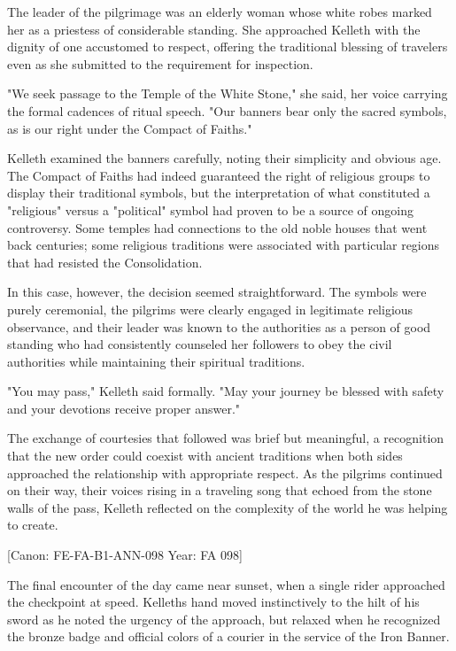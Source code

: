 The leader of the pilgrimage was an elderly woman whose white robes
marked her as a priestess of considerable standing. She approached
Kelleth with the dignity of one accustomed to respect, offering the
traditional blessing of travelers even as she submitted to the
requirement for inspection.

"We seek passage to the Temple of the White Stone," she said, her voice
carrying the formal cadences of ritual speech. "Our banners bear only
the sacred symbols, as is our right under the Compact of Faiths."

Kelleth examined the banners carefully, noting their simplicity and
obvious age. The Compact of Faiths had indeed guaranteed the right of
religious groups to display their traditional symbols, but the
interpretation of what constituted a "religious" versus a "political"
symbol had proven to be a source of ongoing controversy. Some temples
had connections to the old noble houses that went back centuries; some
religious traditions were associated with particular regions that had
resisted the Consolidation.

In this case, however, the decision seemed straightforward. The symbols
were purely ceremonial, the pilgrims were clearly engaged in legitimate
religious observance, and their leader was known to the authorities as a
person of good standing who had consistently counseled her followers to
obey the civil authorities while maintaining their spiritual traditions.

"You may pass," Kelleth said formally. "May your journey be blessed with
safety and your devotions receive proper answer."

The exchange of courtesies that followed was brief but meaningful, a
recognition that the new order could coexist with ancient traditions
when both sides approached the relationship with appropriate respect. As
the pilgrims continued on their way, their voices rising in a traveling
song that echoed from the stone walls of the pass, Kelleth reflected on
the complexity of the world he was helping to create.

{[}Canon: FE-FA-B1-ANN-098 \textbar{} Year: FA 098{]}

The final encounter of the day came near sunset, when a single rider
approached the checkpoint at speed. Kelleth\textquotesingle s hand moved
instinctively to the hilt of his sword as he noted the urgency of the
approach, but relaxed when he recognized the bronze badge and official
colors of a courier in the service of the Iron Banner.

